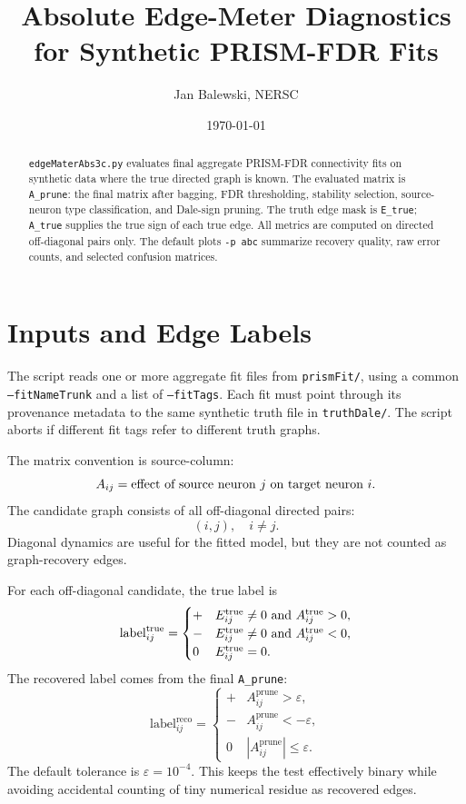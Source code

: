 \documentclass[11pt]{article}
\title{Absolute Edge-Meter Diagnostics for Synthetic PRISM-FDR Fits}
\author{Jan Balewski, NERSC}
\date{\today}
\begin{document}
\maketitle

\begin{abstract}
\texttt{edgeMaterAbs3c.py} evaluates final aggregate PRISM-FDR connectivity
fits on synthetic data where the true directed graph is known. The evaluated
matrix is \texttt{A\_prune}: the final matrix after bagging, FDR thresholding,
stability selection, source-neuron type classification, and Dale-sign pruning.
The truth edge mask is \texttt{E\_true}; \texttt{A\_true} supplies the true
sign of each true edge. All metrics are computed on directed off-diagonal
pairs only. The default plots \texttt{-p abc} summarize recovery quality,
raw error counts, and selected confusion matrices.
\end{abstract}

\tableofcontents
\newpage

\section{Inputs and Edge Labels}
\label{sec:inputs}

The script reads one or more aggregate fit files from \texttt{prismFit/},
using a common \texttt{--fitNameTrunk} and a list of \texttt{--fitTags}. Each
fit must point through its provenance metadata to the same synthetic truth
file in \texttt{truthDale/}. The script aborts if different fit tags refer to
different truth graphs.

The matrix convention is source-column:
\[
  A_{ij} = \hbox{effect of source neuron } j
  \hbox{ on target neuron } i .
\]
The candidate graph consists of all off-diagonal directed pairs:
\[
  (i,j), \quad i\ne j .
\]
Diagonal dynamics are useful for the fitted model, but they are not counted
as graph-recovery edges.

For each off-diagonal candidate, the true label is
\[
\mathrm{label}^{\mathrm{true}}_{ij} =
\begin{cases}
+ & E^{\mathrm{true}}_{ij}\ne0 \hbox{ and } A^{\mathrm{true}}_{ij}>0,\\
- & E^{\mathrm{true}}_{ij}\ne0 \hbox{ and } A^{\mathrm{true}}_{ij}<0,\\
0 & E^{\mathrm{true}}_{ij}=0 .
\end{cases}
\]
The recovered label comes from the final \texttt{A\_prune}:
\[
\mathrm{label}^{\mathrm{reco}}_{ij} =
\begin{cases}
+ & A^{\mathrm{prune}}_{ij} > \varepsilon,\\
- & A^{\mathrm{prune}}_{ij} < -\varepsilon,\\
0 & |A^{\mathrm{prune}}_{ij}|\le\varepsilon .
\end{cases}
\]
The default tolerance is \(\varepsilon=10^{-4}\). This keeps the test
effectively binary while avoiding accidental counting of tiny numerical
residue as recovered edges.
\end{document}
